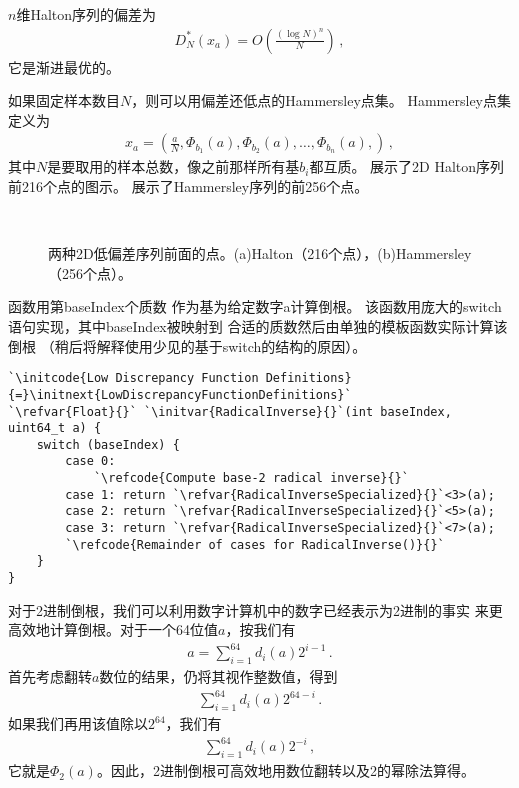 $n$维Halton序列的偏差为
\begin{align*}
    D^*_N(x_a)=O\left(\frac{(\log N)^n}{N}\right)\, ,
\end{align*}
它是渐进最优的。

如果固定样本数目$N$，则可以用偏差还低点的Hammersley点集。
Hammersley点集定义为
\begin{align*}
    x_a=\left(\frac{a}{N},\varPhi_{b_1}(a),\varPhi_{b_2}(a),\ldots,\varPhi_{b_n}(a),\right)\, ,
\end{align*}
其中$N$是要取用的样本总数，像之前那样所有基$b_i$都互质。
展示了2D Halton序列前216个点的图示。
展示了Hammersley序列的前256个点。
\begin{figure}[htbp]
    \centering
    \,
    \caption{两种2D低偏差序列前面的点。(a)Halton（216个点），(b)Hammersley（256个点）。}
    \label{fig:7.25}
\end{figure}

函数用第{\ttfamily baseIndex}个质数
作为基为给定数字{\ttfamily a}计算倒根。
该函数用庞大的{\ttfamily switch}语句实现，其中{\ttfamily baseIndex}被映射到
合适的质数然后由单独的模板函数实际计算该倒根
（稍后将解释使用少见的基于{\ttfamily switch}的结构的原因）。
\begin{lstlisting}
`\initcode{Low Discrepancy Function Definitions}{=}\initnext{LowDiscrepancyFunctionDefinitions}`
`\refvar{Float}{}` `\initvar{RadicalInverse}{}`(int baseIndex, uint64_t a) {
    switch (baseIndex) {
        case 0:
            `\refcode{Compute base-2 radical inverse}{}`
        case 1: return `\refvar{RadicalInverseSpecialized}{}`<3>(a);
        case 2: return `\refvar{RadicalInverseSpecialized}{}`<5>(a);
        case 3: return `\refvar{RadicalInverseSpecialized}{}`<7>(a);
        `\refcode{Remainder of cases for RadicalInverse()}{}`
    }
}
\end{lstlisting}

对于2进制倒根，我们可以利用数字计算机中的数字已经表示为2进制的事实
来更高效地计算倒根。对于一个64位值$a$，按我们有
\begin{align*}
    a=\sum\limits_{i=1}^{64}{d_i(a)2^{i-1}}\, .
\end{align*}
首先考虑翻转$a$数位的结果，仍将其视作整数值，得到
\begin{align*}
    \sum\limits_{i=1}^{64}{d_i(a)2^{64-i}}\, .
\end{align*}
如果我们再用该值除以$2^{64}$，我们有
\begin{align*}
    \sum\limits_{i=1}^{64}{d_i(a)2^{-i}}\, ,
\end{align*}
它就是$\varPhi_2(a)$。因此，2进制倒根可高效地用数位翻转以及2的幂除法算得。

